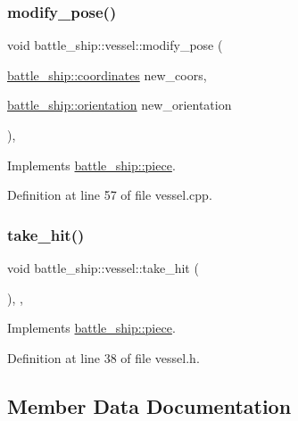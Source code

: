 \subsubsection{\texorpdfstring{modify\+\_\+pose()}{modify\_pose()}}
{\footnotesize\ttfamily void battle\+\_\+ship\+::vessel\+::modify\+\_\+pose (\begin{DoxyParamCaption}\item[{\hyperlink{structbattle__ship_1_1coordinates}{battle\+\_\+ship\+::coordinates}}]{new\+\_\+coors,  }\item[{\hyperlink{namespacebattle__ship_aed87488f0a73f0d0679fe343fb61c784}{battle\+\_\+ship\+::orientation}}]{new\+\_\+orientation }\end{DoxyParamCaption})\hspace{0.3cm}{\ttfamily [override]}, {\ttfamily [virtual]}}



Implements \hyperlink{classbattle__ship_1_1piece_a052305c855625732d3e5ba96d0fca5f9}{battle\+\_\+ship\+::piece}.



Definition at line 57 of file vessel.\+cpp.

\mbox{\label{classbattle__ship_1_1vessel_ab0da3c305902d55594b7aa5d20b69509}} 
\subsubsection{\texorpdfstring{take\+\_\+hit()}{take\_hit()}}
{\footnotesize\ttfamily void battle\+\_\+ship\+::vessel\+::take\+\_\+hit (\begin{DoxyParamCaption}{ }\end{DoxyParamCaption})\hspace{0.3cm}{\ttfamily [inline]}, {\ttfamily [override]}, {\ttfamily [virtual]}}



Implements \hyperlink{classbattle__ship_1_1piece_a77642906503e12eb22fcfbc3eab98cb5}{battle\+\_\+ship\+::piece}.



Definition at line 38 of file vessel.\+h.



\subsection{Member Data Documentation}
\mbox{\label{classbattle__ship_1_1vessel_a5d2b710e2b58847818ba8e22794a97a4}} 
